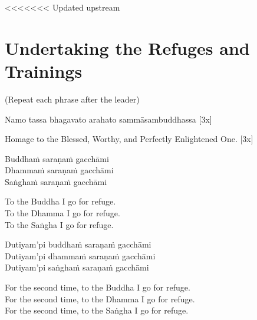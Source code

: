 <<<<<<< Updated upstream
\section{Undertaking the Refuges and Trainings}

\vspace{1em}

\begin{center}
  \textbf{}\makeatletter\hyperlink{endnote138-appendix}\makeatother
\end{center}

\begin{center}
  (Repeat each phrase after the leader)
\end{center}

Namo tassa bhagavato arahato sammāsambuddhassa \hfill{[3x]}

\begin{english}
  Homage to the Blessed, Worthy, and Perfectly Enlightened One. \hfill{[3x]}
\end{english}

Buddhaṁ saraṇaṁ gacchāmi\\
Dhammaṁ saraṇaṁ gacchāmi\\
Saṅghaṁ saraṇaṁ gacchāmi

\begin{english-verses}
  To the Buddha I go for refuge.\\
  To the Dhamma I go for refuge.\\
  To the Saṅgha I go for refuge.
\end{english-verses}

Dutiyam'pi buddhaṁ saraṇaṁ gacchāmi\\
Dutiyam'pi dhammaṁ saraṇaṁ gacchāmi\\
Dutiyam'pi saṅghaṁ saraṇaṁ gacchāmi

\begin{english-verses}
  For the second time, to the Buddha I go for refuge.\\
  For the second time, to the Dhamma I go for refuge.\\
  For the second time, to the Saṅgha I go for refuge.
\end{english-verses}

